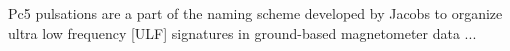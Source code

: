 
Pc5 pulsations are a part of the naming scheme developed by Jacobs to
organize ultra low frequency [ULF] signatures in ground-based
magnetometer data ...
